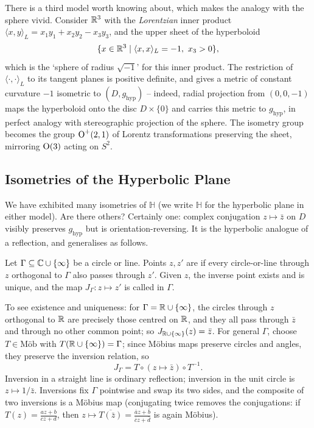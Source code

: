 \documentclass[a4paper]{scrartcl}
\newcommand{\Mob}{\text{M\"ob}}
\newcommand{\HH}{\mathbb{H}}
\begin{document}
\begin{remark}
    There is a third model worth knowing about, which makes the analogy with the sphere vivid. Consider $\mathbb{R}^3$ with the \emph{Lorentzian} inner product $\langle x, y \rangle_L = x_1 y_1 + x_2 y_2 - x_3 y_3$, and the upper sheet of the hyperboloid
    $$
    \{x \in \mathbb{R}^3 \mid \langle x, x \rangle_L = -1, \ x_3 > 0\},
    $$
    which is the `sphere of radius $\sqrt{-1}$' for this inner product. The restriction of $\langle \cdot, \cdot \rangle_L$ to its tangent planes is positive definite, and gives a metric of constant curvature $-1$ isometric to $(D, g_{\mathrm{hyp}})$ -- indeed, radial projection from $(0,0,-1)$ maps the hyperboloid onto the disc $D \times \{0\}$ and carries this metric to $g_{\mathrm{hyp}}$, in perfect analogy with stereographic projection of the sphere. The isometry group becomes the group $\operatorname{O}^+(2,1)$ of Lorentz transformations preserving the sheet, mirroring $\operatorname{O}(3)$ acting on $S^2$.
\end{remark}

\subsection{Isometries of the Hyperbolic Plane}

We have exhibited many isometries of $\HH$ (we write $\HH$ for the hyperbolic plane in either model). Are there others? Certainly one: complex conjugation $z \mapsto \bar z$ on $D$ visibly preserves $g_{\mathrm{hyp}}$ but is orientation-reversing. It is the hyperbolic analogue of a reflection, and generalises as follows.

\begin{definition}[Inversion]
    Let $\Gamma \subseteq \mathbb{C} \cup \{\infty\}$ be a circle or line. Points $z, z'$ are  if every circle-or-line through $z$ orthogonal to $\Gamma$ also passes through $z'$. Given $z$, the inverse point exists and is unique, and the map $J_\Gamma: z \mapsto z'$ is called  in $\Gamma$.
\end{definition}

To see existence and uniqueness: for $\Gamma = \mathbb{R} \cup \{\infty\}$, the circles through $z$ orthogonal to $\mathbb{R}$ are precisely those centred on $\mathbb{R}$, and they all pass through $\bar z$ and through no other common point; so $J_{\mathbb{R} \cup \{\infty\}}(z) = \bar z$. For general $\Gamma$, choose $T \in \Mob$ with $T(\mathbb{R} \cup \{\infty\}) = \Gamma$; since M\"obius maps preserve circles and angles, they preserve the inversion relation, so
$$
J_\Gamma = T \circ (z \mapsto \bar z) \circ T^{-1}.
$$
Inversion in a straight line is ordinary reflection; inversion in the unit circle is $z \mapsto 1/\bar z$. Inversions fix $\Gamma$ pointwise and swap its two sides, and the composite of two inversions is a M\"obius map (conjugating twice removes the conjugations: if $T(z) = \frac{az + b}{cz + d}$, then $z \mapsto \overline{T(\bar z)} = \frac{\bar a z + \bar b}{\bar c z + \bar d}$ is again M\"obius).
\end{document}
